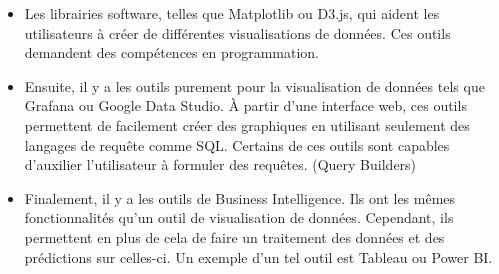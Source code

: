\begin{itemize}
  \item Les librairies software, telles que Matplotlib ou D3.js, qui aident les utilisateurs à créer de différentes visualisations de données. Ces outils demandent des compétences en programmation.

  \item Ensuite, il y a les outils purement pour la visualisation de données tels que Grafana ou Google Data Studio. À partir d’une interface web, ces outils permettent de facilement créer des graphiques en utilisant seulement des langages de requête comme SQL. Certains de ces outils sont capables d’auxilier l’utilisateur à formuler des requêtes. (Query Builders)

  \item Finalement, il y a les outils de Business Intelligence. Ils ont les mêmes fonctionnalités qu’un outil de visualisation de données. Cependant, ils permettent en plus de cela de faire un traitement des données et des prédictions sur celles-ci. Un exemple d’un tel outil est Tableau ou Power BI.
\end{itemize}
